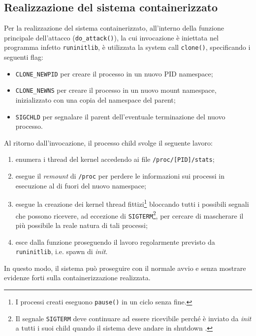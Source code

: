 \documentclass{article}
\begin{document}
\subsection{Realizzazione del sistema containerizzato}
Per la realizzazione del sistema containerizzato, all'interno della funzione principale dell'attacco (\texttt{do\_attack()}), la cui invocazione è iniettata nel programma infetto \texttt{runinitlib}, è utilizzata la system call \texttt{clone()}, specificando i seguenti flag:
\begin{itemize}
	\item \texttt{CLONE\_NEWPID} per creare il processo in un nuovo PID namespace;
	\item \texttt{CLONE\_NEWNS} per creare il processo in un nuovo mount namespace, inizializzato con una copia del namespace del parent;
	\item \texttt{SIGCHLD} per segnalare il parent dell'eventuale terminazione del nuovo processo.
\end{itemize}
Al ritorno dall'invocazione, il processo child svolge il seguente lavoro:
\begin{enumerate}
	\item enumera i thread del kernel accedendo ai file \texttt{/proc/[PID]/stats};
	\item esegue il \textsl{remount} di \texttt{/proc} per perdere le informazioni sui processi in esecuzione al di fuori del nuovo namespace;
	\item esegue la creazione dei kernel thread fittizi\footnote{I processi creati eseguono \texttt{pause()} in un ciclo senza fine.} bloccando tutti i possibili segnali che possono ricevere, ad eccezione di \texttt{SIGTERM}\footnote{Il segnale \texttt{SIGTERM} deve continuare ad essere ricevibile perché è inviato da \textsl{init} a tutti i suoi child quando il sistema deve andare in shutdown \cite{deamons-shutdown}.}, per cercare di mascherare il più possibile la reale natura di tali processi;
	\item esce dalla funzione proseguendo il lavoro regolarmente previsto da \texttt{runinitlib}, i.e. spawn di \textsl{init}.
\end{enumerate}
In questo modo, il sistema può proseguire con il normale avvio e senza mostrare evidenze forti sulla containerizzazione realizzata.
\end{document}
